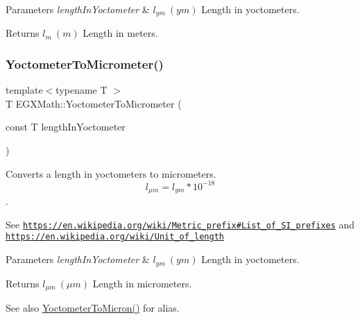 \begin{DoxyParams}{Parameters}
{\em length\+In\+Yoctometer} & $ l_{ym}\ (ym)$ Length in yoctometers. \\
\hline
\end{DoxyParams}
\begin{DoxyReturn}{Returns}
$ l_{m}\ (m)$ Length in meters. 
\end{DoxyReturn}
\mbox{\label{group___e_g_x_math-_conversions-_length_conversions-_yoctometer-_s_i_ga910145f68803fbaa87afd1d30d48c96e}} 
\subsubsection{\texorpdfstring{Yoctometer\+To\+Micrometer()}{YoctometerToMicrometer()}}
{\footnotesize\ttfamily template$<$typename T $>$ \\
T E\+G\+X\+Math\+::\+Yoctometer\+To\+Micrometer (\begin{DoxyParamCaption}\item[{const T}]{length\+In\+Yoctometer }\end{DoxyParamCaption})}



Converts a length in yoctometers to micrometers. \[ l_{\mu m}=l_{ym} * 10^{-18} \]. 

See \href{https://en.wikipedia.org/wiki/Metric_prefix#List_of_SI_prefixes}{\tt https\+://en.\+wikipedia.\+org/wiki/\+Metric\+\_\+prefix\#\+List\+\_\+of\+\_\+\+S\+I\+\_\+prefixes} and \href{https://en.wikipedia.org/wiki/Unit_of_length}{\tt https\+://en.\+wikipedia.\+org/wiki/\+Unit\+\_\+of\+\_\+length} 
\begin{DoxyParams}{Parameters}
{\em length\+In\+Yoctometer} & $ l_{ym}\ (ym)$ Length in yoctometers. \\
\hline
\end{DoxyParams}
\begin{DoxyReturn}{Returns}
$ l_{\mu m}\ (\mu m)$ Length in micrometers. 
\end{DoxyReturn}
\begin{DoxySeeAlso}{See also}
\mbox{\hyperlink{group___e_g_x_math-_conversions-_length_conversions-_yoctometer-_non-_s_i_ga4863fe4d5268ab023ec32d0281171b55}{Yoctometer\+To\+Micron()}} for alias. 
\end{DoxySeeAlso}
\mbox{\label{group___e_g_x_math-_conversions-_length_conversions-_yoctometer-_s_i_ga599936dd87aba0a05d16c0c5992928ca}} 
